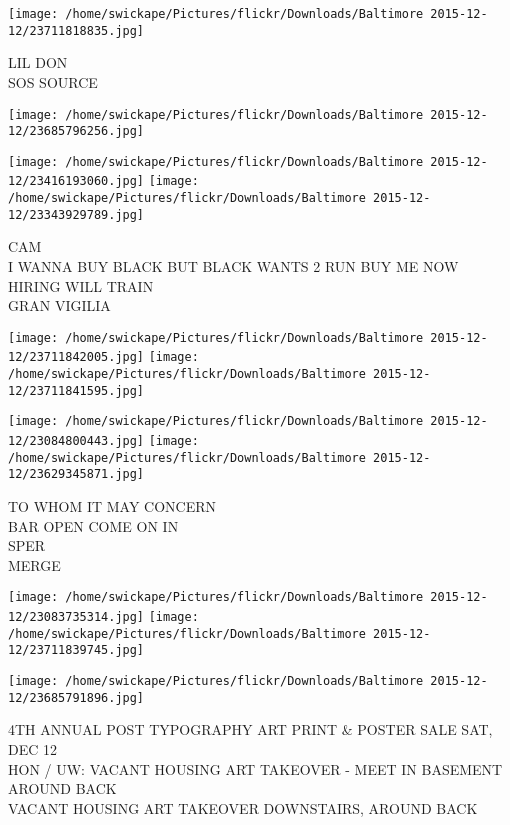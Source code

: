 \documentclass[10pt,letterpaper]{article}
\begin{document}
\vspace{0.25in}
\texttt{[image: /home/swickape/Pictures/flickr/Downloads/Baltimore 2015-12-12/23711818835.jpg]}

LIL DON\\
SOS SOURCE\\
\pagebreak

\texttt{[image: /home/swickape/Pictures/flickr/Downloads/Baltimore 2015-12-12/23685796256.jpg]}

\vspace{0.25in}
\texttt{[image: /home/swickape/Pictures/flickr/Downloads/Baltimore 2015-12-12/23416193060.jpg]}
\texttt{[image: /home/swickape/Pictures/flickr/Downloads/Baltimore 2015-12-12/23343929789.jpg]}

CAM\\
I WANNA BUY BLACK BUT BLACK WANTS 2 RUN BUY ME NOW HIRING WILL TRAIN\\
GRAN VIGILIA\\
\pagebreak

\texttt{[image: /home/swickape/Pictures/flickr/Downloads/Baltimore 2015-12-12/23711842005.jpg]}
\texttt{[image: /home/swickape/Pictures/flickr/Downloads/Baltimore 2015-12-12/23711841595.jpg]}

\texttt{[image: /home/swickape/Pictures/flickr/Downloads/Baltimore 2015-12-12/23084800443.jpg]}
\texttt{[image: /home/swickape/Pictures/flickr/Downloads/Baltimore 2015-12-12/23629345871.jpg]}

TO WHOM IT MAY CONCERN\\
BAR OPEN COME ON IN\\
SPER\\
MERGE\\
\pagebreak

\texttt{[image: /home/swickape/Pictures/flickr/Downloads/Baltimore 2015-12-12/23083735314.jpg]}
\texttt{[image: /home/swickape/Pictures/flickr/Downloads/Baltimore 2015-12-12/23711839745.jpg]}

\vspace{0.25in}
\texttt{[image: /home/swickape/Pictures/flickr/Downloads/Baltimore 2015-12-12/23685791896.jpg]}

4TH ANNUAL POST TYPOGRAPHY ART PRINT \& POSTER SALE SAT, DEC 12\\
HON / UW: VACANT HOUSING ART TAKEOVER {-} MEET IN BASEMENT AROUND BACK\\
VACANT HOUSING ART TAKEOVER DOWNSTAIRS, AROUND BACK\\
\pagebreak
\end{document}
